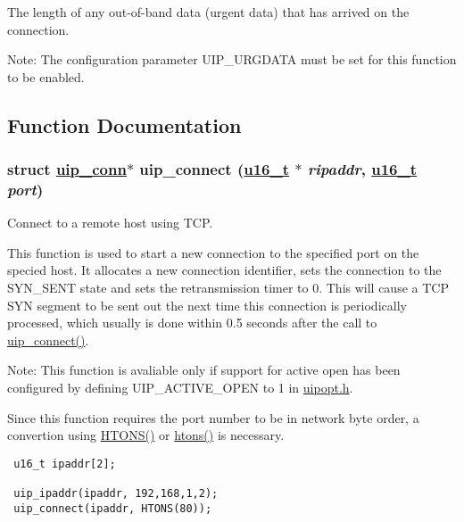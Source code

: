The length of any out-of-band data (urgent data) that has arrived on the connection. 

\begin{Desc}
\item[Note:]The configuration parameter UIP\_\-URGDATA must be set for this function to be enabled. \end{Desc}


\subsection{Function Documentation}
\hypertarget{a00064_gce715881b240922bba96613c2a88fd67}{
\subsubsection[uip\_\-connect]{\setlength{\rightskip}{0pt plus 5cm}struct \hyperlink{a00028}{uip\_\-conn}$\ast$ uip\_\-connect (\hyperlink{a00070_gfc6499c1f28697aa3bfc2804d496fd11}{u16\_\-t} $\ast$ {\em ripaddr}, \hyperlink{a00070_gfc6499c1f28697aa3bfc2804d496fd11}{u16\_\-t} {\em port})}}
\label{a00064_gce715881b240922bba96613c2a88fd67}


Connect to a remote host using TCP. 

This function is used to start a new connection to the specified port on the specied host. It allocates a new connection identifier, sets the connection to the SYN\_\-SENT state and sets the retransmission timer to 0. This will cause a TCP SYN segment to be sent out the next time this connection is periodically processed, which usually is done within 0.5 seconds after the call to \hyperlink{a00064_gce715881b240922bba96613c2a88fd67}{uip\_\-connect()}.

\begin{Desc}
\item[Note:]This function is avaliable only if support for active open has been configured by defining UIP\_\-ACTIVE\_\-OPEN to 1 in \hyperlink{a00058}{uipopt.h}.

Since this function requires the port number to be in network byte order, a convertion using \hyperlink{a00065_g69a7a4951ff21b302267532c21ee78fc}{HTONS()} or \hyperlink{a00065_ga22b04cac8cf283ca12f028578bebc06}{htons()} is necessary.\end{Desc}


\footnotesize\begin{verbatim} u16_t ipaddr[2];

 uip_ipaddr(ipaddr, 192,168,1,2);
 uip_connect(ipaddr, HTONS(80)); 
\end{verbatim}
\normalsize


